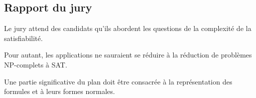 \documentclass[../../Agregation.tex]{subfiles}
\begin{document}

\subsection{Rapport du jury}

\begin{aquote}{}
Le jury attend des candidats qu'ils abordent les questions de la complexité de la satisfiabilité.

Pour autant, les applications ne sauraient se réduire à la réduction de problèmes NP-complets à SAT.

Une partie significative du plan doit être consacrée à la représentation des formules et à leurs formes normales.
\end{aquote}

\dvts
\end{document}
